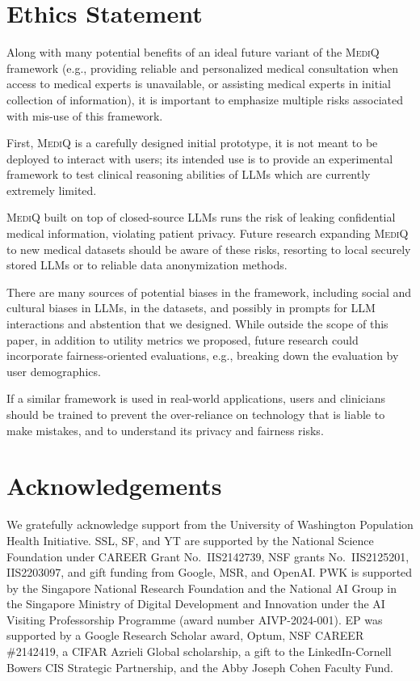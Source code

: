 \documentclass{article}
\begin{document}
\section*{Ethics Statement}\label{sec:ethics}
Along with many potential benefits of an ideal future variant of the \textsc{MediQ} framework (e.g., providing reliable and personalized medical consultation when access to medical experts is unavailable, or assisting medical experts in initial collection of information), it is important to emphasize multiple risks associated with mis-use of this framework. 

First, \textsc{MediQ} is a carefully designed initial prototype, it is not meant to be deployed to interact with users; its intended use is to provide an experimental framework to test clinical reasoning abilities of LLMs which are currently extremely limited. 


\textsc{MediQ} built on top of closed-source LLMs runs the risk of leaking confidential medical information, violating patient privacy. Future research expanding \textsc{MediQ} to new medical datasets should be aware of these risks, resorting to local securely stored LLMs or to reliable data anonymization methods.    


There are many sources of potential biases in the framework, including social and cultural biases in LLMs, in the datasets, and possibly in prompts for LLM interactions and abstention that we designed. While outside the scope of this paper, in addition to utility metrics we proposed, future research could incorporate fairness-oriented evaluations, e.g., breaking down the evaluation by user demographics.  


If a similar framework is used in real-world applications, users and clinicians should be trained to prevent the over-reliance on technology that is liable to make mistakes, and to understand its privacy and fairness risks. 

\section*{Acknowledgements}
We gratefully acknowledge support from the University of Washington Population Health Initiative. 
SSL, SF, and YT are supported by the National Science Foundation under CAREER Grant No.~IIS2142739, NSF grants No.~IIS2125201, IIS2203097, and gift funding from Google, MSR, and OpenAI. 
PWK is supported by the Singapore National Research Foundation and the National AI Group in the Singapore Ministry of Digital Development and Innovation under the AI Visiting Professorship Programme (award number AIVP-2024-001). EP was supported by a Google Research Scholar award, Optum, NSF CAREER
\#2142419, a CIFAR Azrieli Global scholarship, a gift to the LinkedIn-Cornell Bowers CIS Strategic Partnership, and the Abby Joseph Cohen Faculty Fund. 







\clearpage
\newpage


% 
\end{document}
